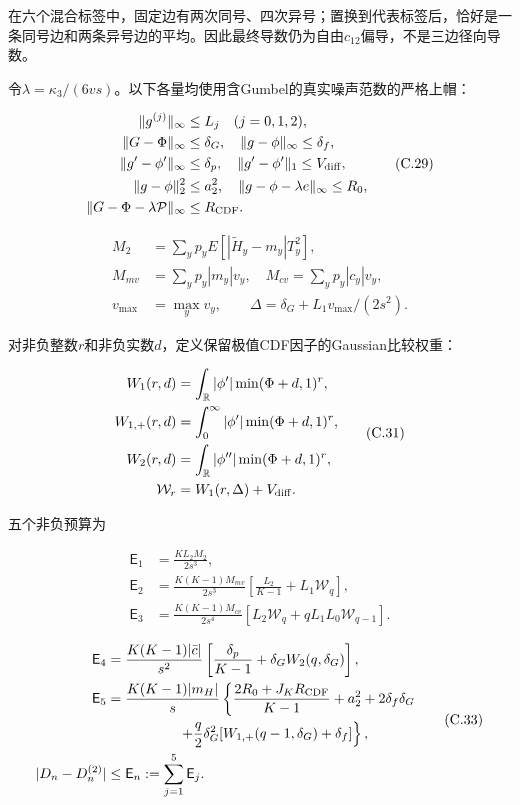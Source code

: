 \documentclass[11pt,a4paper]{article}
\begin{document}
在六个混合标签中，固定边有两次同号、四次异号；置换到代表标签后，恰好是一条同号边和两条异号边的平均。因此最终导数仍为自由\(c_{12}\)偏导，不是三边径向导数。

令\(\lambda=\kappa_3/(6vs)\)。以下各量均使用含Gumbel的真实噪声范数的严格上帽：

\[
\begin{aligned}
\|g^{(j)}\|_\infty&\le L_j\quad(j=0,1,2),\\
\|G-\Phi\|_\infty&\le\delta_G,\quad \|g-\phi\|_\infty\le\delta_f,\\
\|g'-\phi'\|_\infty&\le\delta_p,\quad \|g'-\phi'\|_1\le V_{\rm diff},\\
\|g-\phi\|_2^2&\le a_2^2,\quad \|g-\phi-\lambda e\|_\infty\le R_0,\\
\|G-\Phi-\lambda\mathcal P\|_\infty&\le R_{\rm CDF}.
\end{aligned}
\tag{C.29}
\]

\[
\begin{aligned}
M_2&=\sum_yp_yE[|\widetilde H_y-m_y|T_y^2],\\
M_{mv}&=\sum_yp_y|m_y|v_y,\quad M_{cv}=\sum_yp_y|c_y|v_y,\\
v_{\max}&=\max_yv_y,\qquad \Delta=\delta_G+L_1v_{\max}/(2s^2).
\end{aligned}
\tag{C.30}
\]

对非负整数\(r\)和非负实数\(d\)，定义保留极值CDF因子的Gaussian比较权重：

\[
\begin{aligned}
W_1(r,d)&=\int_{\mathbb R}|\phi'|\min(\Phi+d,1)^r,\\
W_{1,+}(r,d)&=\int_0^\infty|\phi'|\min(\Phi+d,1)^r,\\
W_2(r,d)&=\int_{\mathbb R}|\phi''|\min(\Phi+d,1)^r,\\
\mathcal W_r&=W_1(r,\Delta)+V_{\rm diff}.
\end{aligned}
\tag{C.31}
\]

五个非负预算为

\[
\begin{aligned}
\mathsf E_1&=\frac{KL_2M_2}{2s^3},\\
\mathsf E_2&=\frac{K(K-1)M_{mv}}{2s^3}
\left[\frac{L_2}{K-1}+L_1\mathcal W_q\right],\\
\mathsf E_3&=\frac{K(K-1)M_{cv}}{2s^4}
\left[L_2\mathcal W_q+qL_1L_0\mathcal W_{q-1}\right].
\end{aligned}
\tag{C.32}
\]

\[
\begin{aligned}
\mathsf E_4&=\frac{K(K-1)|\bar c|}{s^2}
\left[\frac{\delta_p}{K-1}+\delta_GW_2(q,\delta_G)\right],\\
\mathsf E_5&=\frac{K(K-1)|m_H|}{s}\left\{
\frac{2R_0+J_KR_{\rm CDF}}{K-1}+a_2^2+2\delta_f\delta_G\right.\\
&\hspace{18mm}\left.+\frac q2\delta_G^2[W_{1,+}(q-1,\delta_G)+\delta_f]\right\},\\
|D_n-D_n^{(2)}|&\le\mathsf E_n:=\sum_{j=1}^5\mathsf E_j.
\end{aligned}
\tag{C.33}
\]
\end{document}
